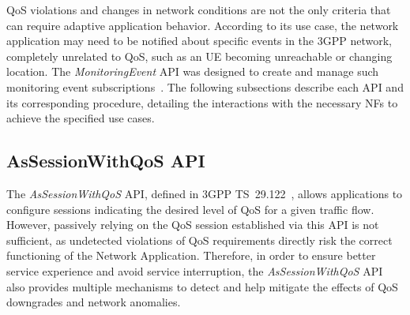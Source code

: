 \acs{QoS} violations and changes in network conditions are not the only criteria that can require adaptive application behavior. According to its use case, the network application may need to be notified about specific events in the \acs{3GPP} network, completely unrelated to \acs{QoS}, such as an \acs{UE} becoming unreachable or changing location. The \textit{MonitoringEvent} \acs{API} was designed to create and manage such monitoring event subscriptions~\cite{ETSI_TS_129_122_V18_8_0}. The following subsections describe each \acs{API} and its corresponding procedure, detailing the interactions with the necessary \acsp{NF} to achieve the specified use cases.


\subsection{AsSessionWithQoS \acs{API}}
\label{chap:proposal:exposure:nef:AsSessionWithQoS}

The \textit{AsSessionWithQoS} \acs{API}, defined in \acs{3GPP} TS~29.122~\cite{ETSI_TS_129_122_V18_8_0}, allows applications to configure sessions indicating the desired level of \acs{QoS} for a given traffic flow. However, passively relying on the \acs{QoS} session established via this \acs{API} is not sufficient, as undetected violations of \acs{QoS} requirements directly risk the correct functioning of the Network Application. Therefore, in order to ensure better service experience and avoid service interruption, the \textit{AsSessionWithQoS} \acs{API} also provides multiple mechanisms to detect and help mitigate the effects of \acs{QoS} downgrades and network anomalies.

